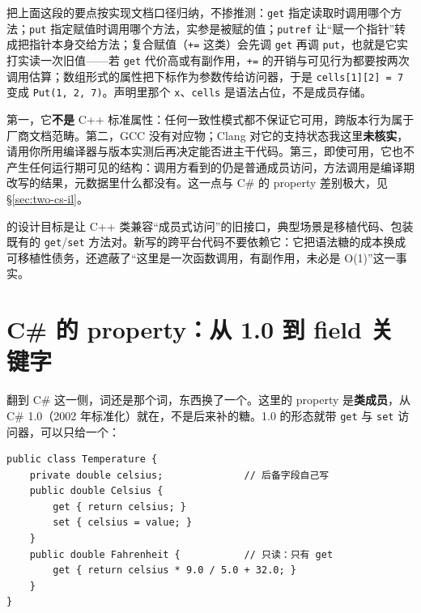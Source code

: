 \documentclass[12pt,a4paper,fontset=fandol]{ctexbook}
\newcommand{\csharplabel}{%
  \tcbox[on line,colback=csharpheadbg,colframe=csharpheadbg,
    boxrule=0pt,arc=1pt,left=2pt,right=2pt,top=1pt,bottom=1pt,
    colupper=white,fontupper=\scriptsize\bfseries]{C\#}}
\newcommand{\kw}[1]{\texttt{#1}}
\newcommand{\seqkw}[1]{\seqsplit{\texttt{#1}}}
\begin{document}
把上面这段的要点按实现文档口径归纳，不掺推测：\kw{get} 指定读取时调用哪个方法；\kw{put} 指定赋值时调用哪个方法，实参是被赋的值；\kw{putref} 让“赋一个指针”转成把指针本身交给方法；复合赋值（\texttt{+=} 这类）会先调 \kw{get} 再调 \kw{put}，也就是它实打实读一次旧值——若 \kw{get} 代价高或有副作用，\texttt{+=} 的开销与可见行为都要按两次调用估算；数组形式的属性把下标作为参数传给访问器，于是 \texttt{cells[1][2] = 7} 变成 \texttt{Put(1, 2, 7)}。声明里那个 \texttt{x}、\texttt{cells} 是语法占位，不是成员存储。

\begin{warning}[title={三条限制，一条比一条硬}]
第一，它\textbf{不是} C++ 标准属性：任何一致性模式都不保证它可用，跨版本行为属于厂商文档范畴。第二，GCC 没有对应物；Clang 对它的支持状态我这里\textbf{未核实}，请用你所用编译器与版本实测后再决定能否进主干代码。第三，即使可用，它也不产生任何运行期可见的结构：调用方看到的仍是普通成员访问，方法调用是编译期改写的结果，元数据里什么都没有。这一点与 C\# 的 property 差别极大，见 \S\ref{sec:two-cs-il}。
\end{warning}

\begin{bestpractice}[title={把它当迁移工具，不当语言特性}]
\seqkw{\_\_declspec(property)} 的设计目标是让 C++ 类兼容“成员式访问”的旧接口，典型场景是移植代码、包装既有的 \texttt{get}/\texttt{set} 方法对。新写的跨平台代码不要依赖它：它把语法糖的成本换成可移植性债务，还遮蔽了“这里是一次函数调用，有副作用，未必是 O(1)”这一事实。
\end{bestpractice}

\section{C\# 的 property：从 1.0 到 field 关键字}
\label{sec:two-cs-property}

翻到 C\# 这一侧，词还是那个词，东西换了一个。这里的 property 是\textbf{类成员}，从 C\# 1.0（2002 年标准化）就在，不是后来补的糖。1.0 的形态就带 \kw{get} 与 \kw{set} 访问器，可以只给一个：

\csharplabel{}
\begin{lstlisting}[style=csharpstyle, caption={C\# 1.0：完整 property 与显式后备字段}, label={lst:ch2-cs-10}]
public class Temperature {
    private double celsius;              // 后备字段自己写
    public double Celsius {
        get { return celsius; }
        set { celsius = value; }
    }
    public double Fahrenheit {           // 只读：只有 get
        get { return celsius * 9.0 / 5.0 + 32.0; }
    }
}
\end{lstlisting}
\end{document}

